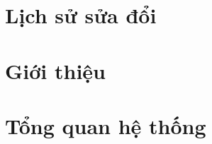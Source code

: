 \documentclass[a4paper]{article}
\begin{document}
\newpage
\thispagestyle{empty}
\tableofcontents

\newpage
\thispagestyle{empty}
\listoffigures
\newpage 

\section{Lịch sử sửa đổi}


\newpage 

\section{Giới thiệu}


\section{Tổng quan hệ thống}


\newpage 
















\end{document}
